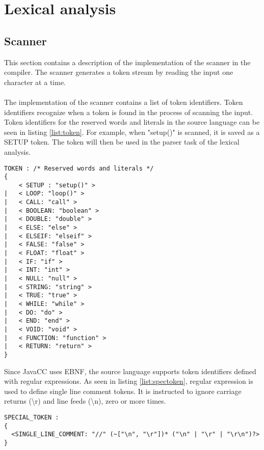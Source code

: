 \section{Lexical analysis}
\subsection{Scanner}
This section contains a description of the implementation of the scanner in the compiler. The scanner generates a token stream by reading the input one character at a time.\\
\\The implementation of the scanner contains a list of token identifiers. Token identifiers recognize when a token is found in the process of scanning the input. Token identifiers for the reserved words and literals in the source language can be seen in listing \ref{list:token}. For example, when "setup()" is scanned, it is saved as a SETUP token. The token will then be used in the parser task of the lexical analysis. 

\begin{lstlisting}[caption=Token identifiers for reserved words and literals, label=list:token]
TOKEN : /* Reserved words and literals */
{
	< SETUP : "setup()" >
|	< LOOP: "loop()" >	
|	< CALL: "call" >
|	< BOOLEAN: "boolean" >
|	< DOUBLE: "double" >
|	< ELSE: "else" >
|	< ELSEIF: "elseif" >
|	< FALSE: "false" >
|	< FLOAT: "float" >
|	< IF: "if" >
|	< INT: "int" >
|	< NULL: "null" >
|	< STRING: "string" >
|	< TRUE: "true" >
|	< WHILE: "while" >
| 	< DO: "do" >
| 	< END: "end" >
|   < VOID: "void" >
|   < FUNCTION: "function" >
|   < RETURN: "return" >
}

\end{lstlisting}
Since JavaCC uses EBNF, the source language supports token identifiers defined with regular expressions. As seen in listing \ref{list:spectoken}, regular expression is used to define single line comment tokens. It is instructed to ignore carriage returns (\textbackslash{r}) and line feeds (\textbackslash{n}), zero or more times. 

\begin{lstlisting}[caption=Special token for single line comment, label=list:spectoken]
SPECIAL_TOKEN :
{
  <SINGLE_LINE_COMMENT: "//" (~["\n", "\r"])* ("\n" | "\r" | "\r\n")?>
}
\end{lstlisting}


 
